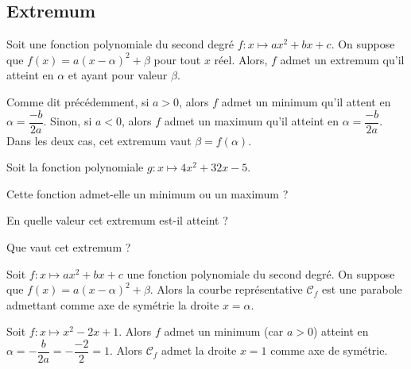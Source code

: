 \documentclass{poly}
\begin{document}
\subsection{Extremum}   
\begin{proposition}
Soit une fonction polynomiale du second degré $f : x \mapsto ax^2 + bx + c$. On suppose que $f(x) = a(x - \alpha)^2 + \beta$ pour tout $x$ réel. Alors, $f$ admet un extremum qu'il atteint en $\alpha$ et ayant pour valeur $\beta$.    
\end{proposition}
\begin{remark}
Comme dit précédemment, si $a > 0$, alors $f$ admet un minimum qu'il attent en $\alpha = \dfrac{-b}{2a}$. Sinon, si $a < 0$, alors $f$ admet un maximum qu'il atteint en $\alpha = \dfrac{-b}{2a}$. Dans les deux cas, cet extremum vaut $\beta = f(\alpha)$.
\end{remark}
\begin{example}
Soit la fonction polynomiale $g : x \mapsto 4x^2 + 32x - 5$.
\begin{alphaquestions}
\item Cette fonction admet-elle un minimum ou un maximum ?
\item En quelle valeur cet extremum est-il atteint ?
\item Que vaut cet extremum ?
\end{alphaquestions}
\end{example}
\begin{proposition}
Soit $f : x \mapsto ax^2 + bx + c$ une fonction polynomiale du second degré. On suppose que $f(x) = a(x - \alpha)^2 + \beta$. Alors la courbe représentative $\mathcal{C}_f$ est une parabole admettant comme axe de symétrie la droite $x = \alpha$.
\end{proposition}
\begin{example}
Soit $f : x \mapsto x^2 - 2x + 1$. Alors $f$ admet un minimum (car $a > 0$) atteint en $\alpha = - \dfrac{b}{2a} = - \dfrac{-2}{2} = 1$. Alors $\mathcal{C}_f$ admet la droite $x = 1$ comme axe de symétrie.
\begin{center}
\end{center}
\end{example}
\end{document}
